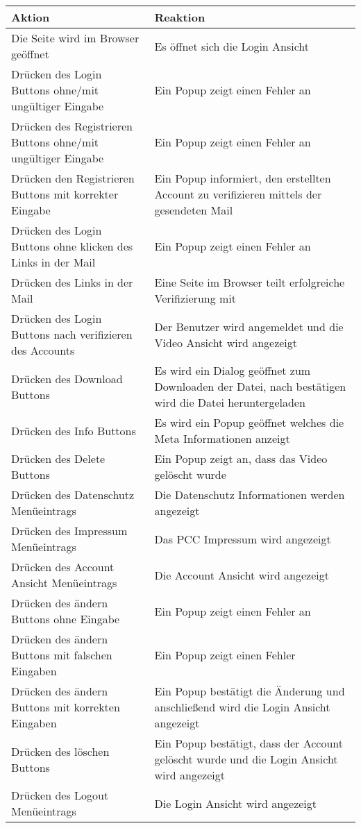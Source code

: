 \begin{longtable}{p{} | p{}}
\hline
\textbf{Aktion} & \textbf{Reaktion}\\
\hline
Die Seite wird im Browser geöffnet & Es öffnet sich die Login Ansicht\\
\hline
Drücken des Login Buttons ohne/mit ungültiger Eingabe & Ein Popup zeigt einen Fehler an\\
\hline
Drücken des Registrieren Buttons ohne/mit ungültiger Eingabe& Ein Popup zeigt einen Fehler an\\
\hline
Drücken den Registrieren Buttons mit korrekter Eingabe & Ein Popup informiert, den erstellten Account zu verifizieren mittels der gesendeten Mail\\
\hline  
Drücken des Login Buttons ohne klicken des Links in der Mail & Ein Popup zeigt einen Fehler an\\
\hline  
Drücken des Links in der Mail & Eine Seite im Browser teilt erfolgreiche Verifizierung mit\\
\hline
Drücken des Login Buttons nach verifizieren des Accounts & Der Benutzer wird angemeldet und die Video Ansicht wird angezeigt\\
\hline
Drücken des Download Buttons & Es wird ein Dialog geöffnet zum Downloaden der Datei, nach bestätigen wird die Datei heruntergeladen\\
\hline
Drücken des Info Buttons & Es wird ein Popup geöffnet welches die Meta Informationen anzeigt\\
\hline
Drücken des Delete Buttons & Ein Popup zeigt an, dass das Video gelöscht wurde\\
\hline
Drücken des Datenschutz Menüeintrags & Die Datenschutz Informationen werden angezeigt\\
\hline
Drücken des Impressum Menüeintrags & Das PCC Impressum wird angezeigt\\
\hline
Drücken des Account Ansicht Menüeintrags & Die Account Ansicht wird angezeigt\\
\hline
Drücken des ändern Buttons ohne Eingabe & Ein Popup zeigt einen Fehler an\\
\hline
Drücken des ändern Buttons mit falschen Eingaben & Ein Popup zeigt einen Fehler\\
\hline
Drücken des ändern Buttons mit korrekten Eingaben & Ein Popup bestätigt die Änderung und anschließend wird die Login Ansicht angezeigt\\
\hline
Drücken des löschen Buttons & Ein Popup bestätigt, dass der Account gelöscht wurde und die Login Ansicht wird angezeigt\\
\hline
Drücken des Logout Menüeintrags & Die Login Ansicht wird angezeigt\\
\hline

 \end{longtable}
